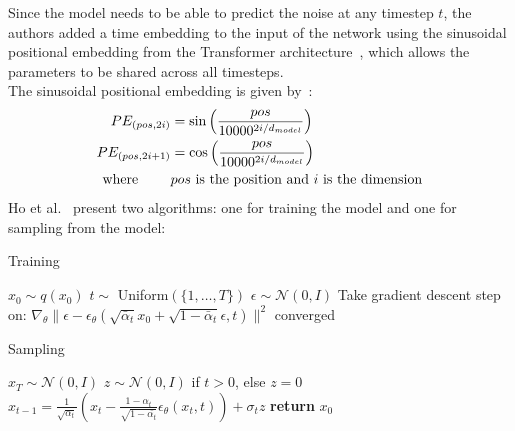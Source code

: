 \documentclass[twoside]{article}
\numberwithin{equation}{section}
\numberwithin{figure}{section}
\begin{document}
Since the model needs to be able to predict the noise at any timestep $t$, the authors added a time embedding to the input of the network using the sinusoidal positional embedding from the Transformer architecture~\cite{vaswani2023attention}, which allows the parameters to be shared across all timesteps. \\
The sinusoidal positional embedding is given by~\cite{vaswani2023attention}:
\begin{align}
  PE_{(pos, 2i)} &= \sin \left( \frac{pos}{10000^{2i/d_{model}}} \right) \\
  PE_{(pos, 2i+1)} &= \cos \left( \frac{pos}{10000^{2i/d_{model}}} \right) \\
  \text{where } \qquad & pos \text{ is the position and } i \text{ is the dimension} \notag
\end{align}
Ho et al.~\cite{ho2020denoising} present two algorithms: one for training the model and one for sampling from the model:
\\
\begin{minipage}{0.49\textwidth}
  \begin{algorithm}[H]
    \centering
    \caption{Training}\label{alg:training}
    \begin{algorithmic}[1]
      \Repeat
      \State $x_0 \sim q(x_0)$
      \State $t \sim$ Uniform$(\{1,\ldots, T\})$
      \State $\epsilon \sim \mathcal{N}(0, I)$
      \State Take gradient descent step on:
      \State \quad $\nabla_\theta \| \epsilon - \epsilon_\theta \left( \sqrt{\bar{\alpha}_t} x_0 + \sqrt{1 - \bar{\alpha}_t} \epsilon, t \right) \|^2$
      \Until converged
    \end{algorithmic}
  \end{algorithm}
\end{minipage}
\hfill
\begin{minipage}{0.49\textwidth}
  \begin{algorithm}[H]
    \centering
    \caption{Sampling}\label{alg:sampling}
    \begin{algorithmic}[1]
      \State $x_T \sim \mathcal{N}(0, I)$
        \State $z \sim \mathcal{N}(0, I)$ if $t > 0$, else $z = 0$
        \State $x_{t-1} = \frac{1}{\sqrt{\alpha_t}} \left( x_t - \frac{1 - \alpha_t}{\sqrt{1 - \bar{\alpha_t}}} \epsilon_\theta (x_t, t) \right) + \sigma_t z $
      \EndFor
      \State \textbf{return} $x_0$
    \end{algorithmic}
  \end{algorithm}
\end{minipage}
\end{document}
